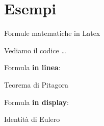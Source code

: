 \section{Esempi}
  \begin{frame}{Formule matematiche in Latex}

    Vediamo il codice \dots

    Formula \textbf{in linea}:

    \begin{exampleblock}{Teorema di Pitagora}
      
    \end{exampleblock}

    Formula \textbf{in display}:

    \begin{exampleblock}{Identità di Eulero}
      
    \end{exampleblock}

\end{frame}
